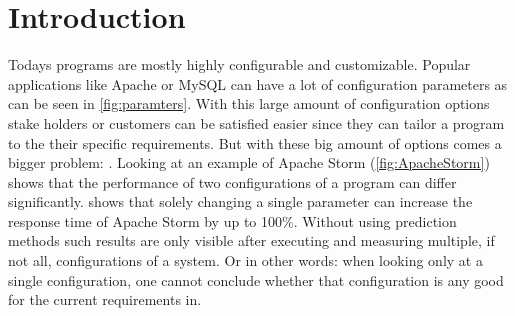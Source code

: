 
\section{Introduction} \label{sec:introduction}
Todays programs are mostly highly configurable and customizable. Popular applications like Apache or MySQL can have a lot of configuration parameters as can be seen in \cref{fig:paramters}. With this large amount of  configuration options stake holders or customers can be satisfied easier since they can tailor a program to the their specific requirements. But with these big amount of options comes a bigger problem: . Looking at an example of Apache Storm (\cref{fig:ApacheStorm}) shows that the performance of two configurations of a program can differ significantly.  shows that solely changing a single parameter can increase the response time of Apache Storm by up to 100\%. Without using prediction methods such results are only visible after executing and measuring multiple, if not all, configurations of a system. Or in other words: when looking only at a single configuration, one cannot conclude whether that configuration is any good for the current requirements in.

